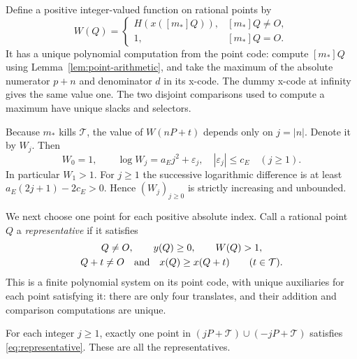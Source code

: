 Define a positive integer-valued function on rational points by
\[
 W(Q)=
 \begin{cases}
 H(x([m_*]Q)),&[m_*]Q\ne O,\\
 1,&[m_*]Q=O.
 \end{cases}
\]
It has a unique polynomial computation from the point code: compute
\([m_*]Q\) using Lemma~\ref{lem:point-arithmetic}, and take the
maximum of the absolute numerator \(p+n\) and denominator \(d\)
in its x-code.  The dummy x-code at infinity gives the same value
one.  The two disjoint comparisons used to compute a maximum have
unique slacks and selectors.

Because \(m_*\) kills \(\mathcal T\), the value of
\(W(nP+t)\) depends only on \(j=|n|\).  Denote it by \(W_j\).
Then
\begin{equation}\label{eq:quadratic-sequence}
 W_0=1,\qquad
 \log W_j=a_Ej^2+\varepsilon_j,
 \quad |\varepsilon_j|\le c_E\quad(j\ge1).
\end{equation}
In particular \(W_1>1\).  For \(j\ge1\) the successive
logarithmic difference is at least
\(a_E(2j+1)-2c_E>0\).  Hence \((W_j)_{j\ge0}\) is strictly
increasing and unbounded.

We next choose one point for each positive absolute index.  Call a
rational point \(Q\) a \emph{representative} if it satisfies
\begin{equation}\label{eq:representative}
 \begin{gathered}
 Q\ne O,\qquad y(Q)\ge0,\qquad W(Q)>1,\\
 Q+t\ne O\quad\hbox{and}\quad x(Q)\ge x(Q+t)
       \qquad(t\in\mathcal T).
 \end{gathered}
\end{equation}
This is a finite polynomial system on its point code, with unique
auxiliaries for each point satisfying it: there are only four
translates, and their addition and comparison computations are unique.

\begin{lemma}\label{lem:representatives}
For each integer \(j\ge1\), exactly one point in
\((jP+\mathcal T)\cup(-jP+\mathcal T)\) satisfies
\eqref{eq:representative}.  These are all the representatives.
\end{lemma}

